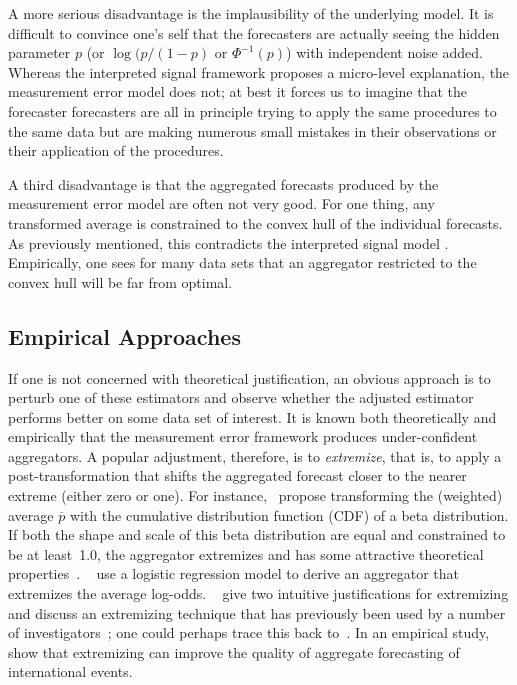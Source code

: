 \documentclass[11pt]{article}
\theoremstyle{definition}
\theoremstyle{definition}
\def\pb{\overline{p}}
\begin{document}
A more serious disadvantage is the implausibility of the underlying 
model.  It is difficult to convince one's self that the forecasters
are actually seeing the hidden parameter $p$ (or $\log(p/(1-p)$ 
or $\Phi^{-1} (p)$) with independent noise added.  Whereas the
interpreted signal framework proposes a micro-level explanation,
the measurement error model does not; at best it forces us to 
imagine that the forecaster forecasters are all in principle trying
to apply the same procedures to the same data but are making
numerous small mistakes in their observations or their application 
of the procedures.  

A third disadvantage is that the aggregated forecasts produced by
the measurement error model are often not very good.  For one thing,
any transformed average is constrained to the convex hull of the
individual forecasts.  As previously mentioned, this contradicts the 
interpreted signal model \citep{parunak2013characterizing}.  Empirically, one sees for many data 
sets that an aggregator restricted to the convex hull will be far 
from optimal.  

\subsection{Empirical Approaches}
\label{ss:empirical}

If one is not concerned with theoretical justification, an obvious
approach is to perturb one of these estimators and observe 
whether the adjusted estimator performs better on some data set
of interest.  It is known both theoretically and empirically
that the measurement error framework produces under-confident 
aggregators.  A popular adjustment, therefore, is to {\em extremize},
that is, to apply a post-transformation that shifts the 
aggregated forecast closer to the nearer extreme (either zero or one).
For instance,~\citet{Ranjan08} propose transforming
the (weighted) average $\pb$ with the cumulative distribution function
(CDF) of a beta distribution.  If both the shape and scale of this 
beta distribution are equal and constrained to be at least~1.0,
the aggregator extremizes and has some attractive theoretical
properties~\citep{Wallsten2001}.  ~\citet{satopaa}
use a logistic regression model to derive an aggregator that extremizes
the average log-odds.  ~\citet{baron2014two} give two intuitive
justifications for extremizing and discuss an extremizing technique
that has previously been used by a number of investigators~\citep{Erev1994,
shlomi2010subjective}; one could perhaps trace this back
to~\citet{karmarkar1978subjectively}.  
In an empirical study,~\citet{mellers2014psychological} show that 
extremizing can improve the quality of aggregate forecasting of 
international events.  
\end{document}
